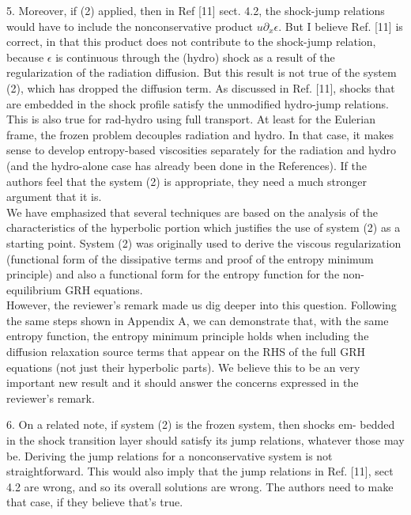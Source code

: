 \documentclass{article}
\begin{document}
{
\color{blue}
5. Moreover, if (2) applied, then in Ref [11] sect. 4.2, the shock-jump relations would have to include the nonconservative product $u \partial_x \epsilon$. But
I believe Ref. [11] is correct, in that this product does not contribute to the shock-jump relation, because $\epsilon$ is continuous through the (hydro) shock as a result of the regularization of the radiation diffusion. But this result is not true of the system (2), which has dropped the diffusion term. As discussed in Ref. [11], shocks that are embedded in the shock profile satisfy the unmodified hydro-jump relations. This is also true for rad-hydro using full transport. At least for the Eulerian frame, the frozen problem decouples radiation and hydro. In that case, it makes sense to develop entropy-based viscosities separately for the radiation and hydro (and the hydro-alone case has already been done in the References). If the authors feel that the system (2) is appropriate, they need a much stronger argument that it is.
\\}
We have emphasized that several techniques are based on the analysis of the characteristics of the hyperbolic portion which justifies the use of system (2) as a starting point. System (2) was originally used to derive the viscous regularization (functional form of the dissipative terms and proof of the entropy minimum principle) and also a functional form for the entropy function for the non-equilibrium GRH equations.\\

However, the reviewer's remark made us dig deeper into this question. Following the same steps shown in Appendix A, we can demonstrate that, with the same entropy function, the entropy minimum principle holds when including the diffusion relaxation source terms that appear on the RHS of the full GRH equations (not just their hyperbolic parts). We believe this to be an very important new result and it should answer the concerns expressed in the reviewer's remark. 

\bigskip


{
\color{blue}
6. On a related note, if system (2) is the frozen system, then shocks em- bedded in the shock transition layer should satisfy its jump relations, whatever those may be. Deriving the jump relations for a nonconservative system is not straightforward. This would also imply that the jump relations in Ref. [11], sect 4.2 are wrong, and so its overall solutions are wrong. The authors need to make that case, if they believe that's true.
}
\end{document}
